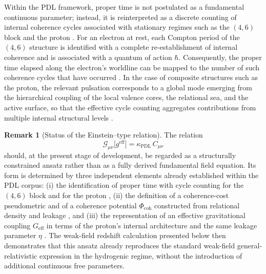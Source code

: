 \documentclass[11pt,a4paper]{article}
\theoremstyle{definition}
\newtheorem{remark}[theorem]{Remark}
\newcommand{\PDL}{\mathrm{PDL}}
\newcommand{\Geff}{G_{\mathrm{eff}}}
\newcommand{\etaL}{\eta} %
\newcommand{\Ccoh}{C_{\mu\nu}} %
\begin{document}
Within the PDL framework, proper time is not postulated as a fundamental continuous parameter; instead, it is reinterpreted as a discrete counting of internal coherence cycles associated with stationary regimes such as the $(4,6)$ block and the proton \cite{PDL,PDL_Global_Mapping_Structures_Results_Open_Problems}. For an electron at rest, each Compton period of the $(4,6)$ structure is identified with a complete re-establishment of internal coherence and is associated with a quantum of action $\hbar$. Consequently, the proper time elapsed along the electron’s worldline can be mapped to the number of such coherence cycles that have occurred \cite{PDL,PDL_introduction}. In the case of composite structures such as the proton, the relevant pulsation corresponds to a global mode emerging from the hierarchical coupling of the local valence cores, the relational sea, and the active surface, so that the effective cycle counting aggregates contributions from multiple internal structural levels \cite{PDL,PDL_Global_Mapping_Structures_Results_Open_Problems}.

\begin{remark}[Status of the Einstein--type relation]
The relation
\begin{equation}
\mathcal{G}_{\mu\nu}\big[g^{\mathrm{eff}}\big] = \kappa_{\PDL}\, \Ccoh
\end{equation}
should, at the present stage of development, be regarded as a structurally constrained ansatz rather than as a fully derived fundamental field equation. Its form is determined by three independent elements already established within the PDL corpus: (i) the identification of proper time with cycle counting for the $(4,6)$ block and for the proton \cite{PDL,PDL_Global_Mapping_Structures_Results_Open_Problems}, (ii) the definition of a coherence-cost pseudometric and of a coherence potential $\Phi_{\mathrm{coh}}$ constructed from relational density and leakage \cite{A_Topological_Reformulation_in_the_Projective_Dynamic_Logo_Framework_Hierarchical_Coherence_Filtering_and_the_Exponent_18_in_PDL}, and (iii) the representation of an effective gravitational coupling $\Geff$ in terms of the proton’s internal architecture and the same leakage parameter $\etaL$ \cite{Hierarchical_Coherence_Filtering_and_the_Exponent_18_in_PDL}. The weak-field redshift calculation presented below then demonstrates that this ansatz already reproduces the standard weak-field general-relativistic expression in the hydrogenic regime, without the introduction of additional continuous free parameters.
\end{remark}
\end{document}
